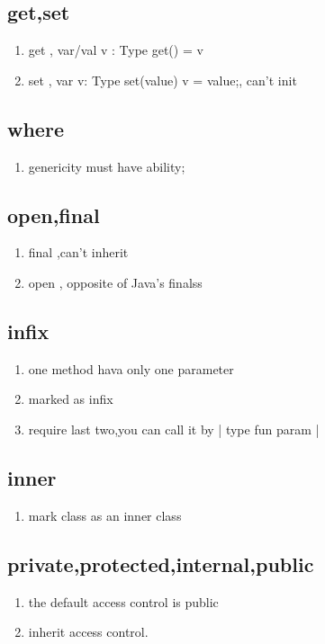 \documentclass{article}
\begin{document}
    \subsection{get,set}
         \begin{enumerate}
             \item get , var/val v : Type get() = v
             \item set , var v: Type set(value){ v = value;}, can't init
         \end{enumerate}
    \subsection{where}
         \begin{enumerate}
             \item genericity must have ability;
         \end{enumerate}
    \subsection{open,final}
         \begin{enumerate}
             \item final ,can't inherit
             \item open , opposite of Java's finalss
         \end{enumerate}
    \subsection{infix}
         \begin{enumerate}
             \item one method hava only one parameter
             \item marked as infix
             \item require last two,you can call it by | type fun param |
         \end{enumerate}
    \subsection{inner}
         \begin{enumerate}
             \item mark class as an inner class
         \end{enumerate}

    \subsection{private,protected,internal,public}
            \begin{enumerate}
                \item the default access control is public
                \item inherit access control.
            \end{enumerate}
\end{document}
